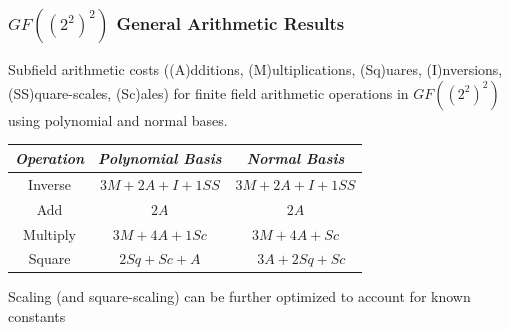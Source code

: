 \documentclass[handout,10pt]{beamer}
\begin{document}
\begin{frame}
	\frametitle{$GF((2^2)^2)$ General Arithmetic Results}
Subfield arithmetic costs ((A)dditions, (M)ultiplications, (Sq)uares, (I)nversions, (SS)quare-scales, (Sc)ales) for finite field arithmetic operations in $GF((2^2)^2)$ using polynomial and normal bases.
\begin{table}[ht!]
\begin{center}
	\begin{tabular}{| c | c | c |} \hline
	\emph{Operation} & \emph{Polynomial Basis} & \emph{Normal Basis} \\ \hline
	Inverse & $3M + 2A + I + 1SS$ & $3M + 2A + I + 1SS$ \\
	Add & $2A$ & $2A$ \\
	Multiply & $3M + 4A + 1Sc$ & $3M + 4A + Sc$ \\
	Square & $2Sq + Sc + A$ & ~ $3A + 2Sq + Sc$ \\ \hline
	\end{tabular}
\end{center}
\end{table}

Scaling (and square-scaling) can be further optimized to account for known constants

\end{frame}
\end{document}
